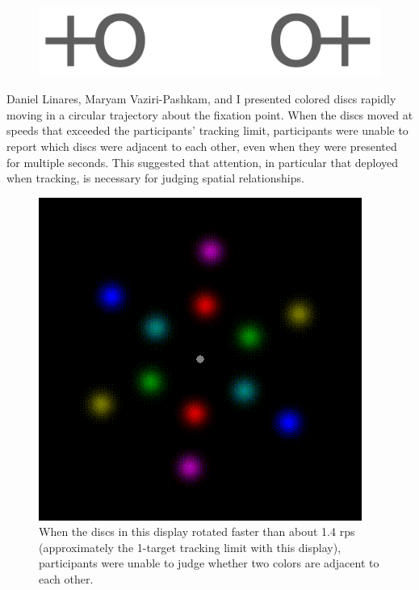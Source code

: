 \documentclass[
]{book}
\begin{document}
\begin{figure}
\includegraphics[width=0.3\linewidth]{imagesForRmd/spatialRelations/ThorntonVenusSymbols} \caption{ }\label{fig:venusSymbols}
\end{figure}

Daniel Linares, Maryam Vaziri-Pashkam, and I presented colored discs rapidly moving in a circular trajectory about the fixation point. When the discs moved at speeds that exceeded the participants' tracking limit, participants were unable to report which discs were adjacent to each other, even when they were presented for multiple seconds. This suggested that attention, in particular that deployed when tracking, is necessary for judging spatial relationships.

\begin{figure}
\includegraphics[width=1\linewidth]{movies/LinaresVaziriPashkamHolcombe/pairingOneStimulusCycleSoRotatesPereniallyStatic} \caption{When the discs in this display rotated faster than about 1.4 rps (approximately the 1-target tracking limit with this display), participants were unable to judge whether two colors are adjacent to each other.}\label{fig:spinner}
\end{figure}
\end{document}

